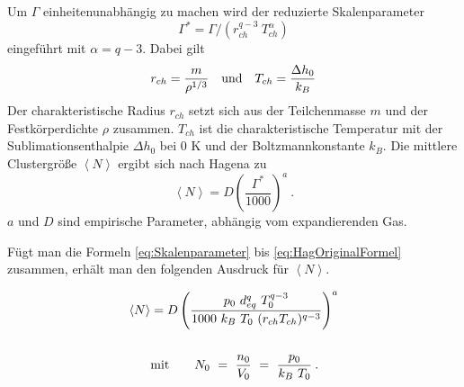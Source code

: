 Um $\Gamma$ einheitenunabhängig zu machen wird der reduzierte Skalenparameter
%
\begin{equation} \label{eq:RedSkalenparameter}
\Gamma^* = \Gamma / (r_{ch}^{q-3}\ T_{ch}^{\alpha})
\end{equation}
%
eingeführt mit $\alpha= q - 3$. Dabei gilt
%
\begin{equation}
r_{ch} = \frac{m}{\rho ^{1/3}}\quad \textmd{und}\quad T_{ch}= \frac{ \Delta h_0}{k_B}
\end{equation}
%
Der charakteristische Radius $r_{ch}$ setzt sich aus der Teilchenmasse $m$ und der Festkörperdichte $\rho$ zusammen. $T_{ch}$ ist die charakteristische Temperatur mit der Sublimationsenthalpie $\Delta h_0$ bei 0 K  und der Boltzmannkonstante $k_B$.  Die mittlere Clustergröße $\left\langle N \right\rangle $ ergibt sich nach Hagena zu
%
\begin{equation} \label{eq:HagOriginalFormel}
\left\langle N \right\rangle  = D \left( \frac{\Gamma^*}{1000}\right)^a \:.
\end{equation}
%
$a$ und $D$ sind empirische Parameter, abhängig vom expandierenden Gas.

Fügt man die Formeln \ref{eq:Skalenparameter} bis \ref{eq:HagOriginalFormel} zusammen, erhält man den folgenden Ausdruck für $\left\langle N \right\rangle $.

\begin{equation}
	\begin{split}
	\left\langle N \right\rangle & = D \left( \frac{p_0\ d_{eq}^q \ T_0^{q-3}}{1000\ k_B\ T_0\ (r_{ch}T_{ch})^{q-3}}\right)^a \\ \\
	& \textmd{mit} \qquad N_0\  =\ \frac{n_0}{V_0}\ =\ \frac{p_0}{k_B\ T_0} \: .
	\end{split}
\end{equation}

